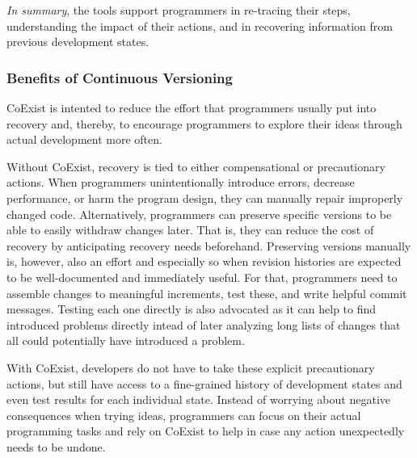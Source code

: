 \emph{In summary}, the tools support programmers in re-tracing their steps, understanding the impact of their actions, and in recovering information from previous development states.


\subsubsection{Benefits of Continuous Versioning}

CoExist is intented to reduce the effort that programmers usually put into recovery and, thereby, to encourage programmers to explore their ideas through actual development more often.

Without CoExist, recovery is tied to either compensational or precautionary actions.
When programmers unintentionally introduce errors, decrease performance, or harm the program design, they can manually repair improperly changed code.
Alternatively, programmers can preserve specific versions to be able to easily withdraw changes later.
That is, they can reduce the cost of recovery by anticipating recovery needs beforehand.
Preserving versions manually is, however, also an effort and especially so when revision histories are expected to be well-documented and immediately useful.
For that, programmers need to assemble changes to meaningful increments, test these, and write helpful commit messages.
Testing each one directly is also advocated as it can help to find introduced problems directly intead of later analyzing long lists of changes that all could potentially have introduced a problem.

With CoExist, developers do not have to take these explicit precautionary actions, but still have access to a fine-grained history of development states and even test results for each individual state.
Instead of worrying about negative consequences when trying ideas, programmers can focus on their actual programming tasks and rely on CoExist to help in case any action unexpectedly needs to be undone.



